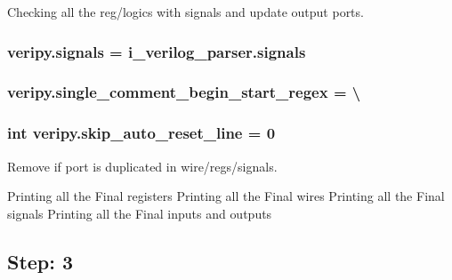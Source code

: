Checking all the reg/logics with signals and update output ports. \hypertarget{namespaceveripy_af405930307c7e7f4310d7b720cf3c608}{
\subsubsection[{signals}]{\setlength{\rightskip}{0pt plus 5cm}veripy.\-signals = i\-\_\-verilog\-\_\-parser.\-signals}}\label{namespaceveripy_af405930307c7e7f4310d7b720cf3c608}
\hypertarget{namespaceveripy_a314fe1312fbb83c74fb29a23eb5dd7b2}{
\subsubsection[{single\-\_\-comment\-\_\-begin\-\_\-start\-\_\-regex}]{\setlength{\rightskip}{0pt plus 5cm}veripy.\-single\-\_\-comment\-\_\-begin\-\_\-start\-\_\-regex = \textbackslash{}}}\label{namespaceveripy_a314fe1312fbb83c74fb29a23eb5dd7b2}
\hypertarget{namespaceveripy_acebf2b0050dc39a37718a8ef927abc7c}{
\subsubsection[{skip\-\_\-auto\-\_\-reset\-\_\-line}]{\setlength{\rightskip}{0pt plus 5cm}int veripy.\-skip\-\_\-auto\-\_\-reset\-\_\-line = 0}}\label{namespaceveripy_acebf2b0050dc39a37718a8ef927abc7c}


Remove if port is duplicated in wire/regs/signals. 

Printing all the Final registers Printing all the Final wires Printing all the Final signals Printing all the Final inputs and outputs \subsection*{Step\-: 3 }

